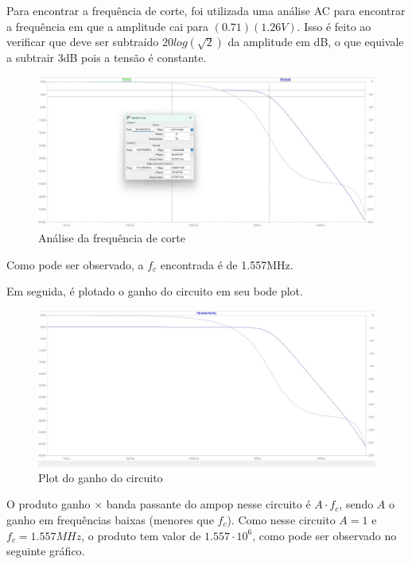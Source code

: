 \documentclass[10pt,twocolumn,letterpaper]{article}
\begin{document}
Para encontrar a frequência de corte, foi utilizada uma análise AC para encontrar a frequência em que a amplitude cai para $(0.71)(1.26V)$.	Isso é feito ao verificar que deve ser subtraído  $20log(\sqrt{2})$ da amplitude em dB, o que equivale a subtrair 3dB pois a tensão é constante.

\begin{figure}[h]
\caption{Análise da frequência de corte}
\begin{center}
\includegraphics[scale=0.15]{figuras/fig3}
\end{center}
\end{figure}

Como pode ser observado, a $f_c$ encontrada é de 1.557MHz.

Em seguida, é plotado o ganho do circuito em seu bode plot.

\begin{figure}[h]
\caption{Plot do ganho do circuito}
\begin{center}
\includegraphics[scale=0.15]{figuras/fig4}
\end{center}
\end{figure}

O produto ganho $\times$ banda passante do ampop nesse circuito é $A\cdot f_c$, sendo $A$ o ganho em frequências baixas (menores que $f_c$). Como nesse circuito $A=1$ e $f_c=1.557MHz$, o produto tem valor de $1.557\cdot10^6$, como pode ser observado no seguinte gráfico.
\end{document}
